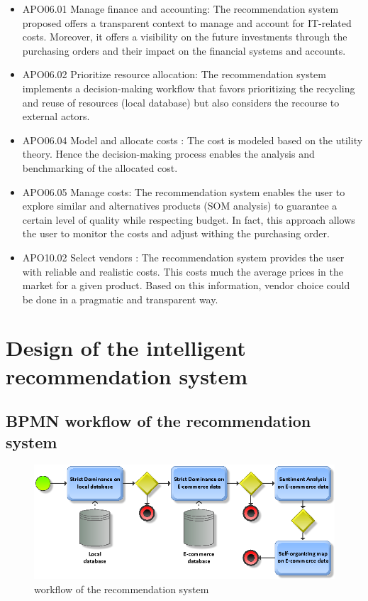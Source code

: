 \documentclass[preprint,3p,onecolumn]{elsarticle}
\begin{document}
\begin{itemize}
    \item APO06.01 Manage finance and accounting: The recommendation system proposed offers a transparent context to manage and account for IT-related costs. Moreover, it offers a visibility on the future investments through the purchasing orders and their impact on the financial systems and accounts. 
    \item APO06.02 Prioritize resource allocation: The recommendation system implements a decision-making workflow that favors prioritizing the recycling and reuse of resources (local database) but also considers the recourse to external actors.
    \item APO06.04 Model and allocate costs : The cost is modeled based on the utility theory. Hence the decision-making process enables the analysis and benchmarking of the allocated cost.
    \item APO06.05 Manage costs: The recommendation system enables the user to explore similar and alternatives products (SOM analysis) to guarantee a certain level of quality while respecting budget. In fact, this approach allows the user to monitor the costs and adjust withing the purchasing order. 
    \item APO10.02 Select vendors : The recommendation system provides the user with reliable and realistic costs. This costs much the average prices in the market for a given product. Based on this information, vendor choice could be done in a pragmatic and transparent way.
\end{itemize}


\section{Design of the intelligent recommendation system }
\subsection{BPMN workflow of the recommendation system} 

\begin{figure}[H]
\centering
\includegraphics[scale=.5]{rs_workflow}
\caption{workflow of the recommendation system}
\label{rs_workflow}
\end{figure}
\end{document}
